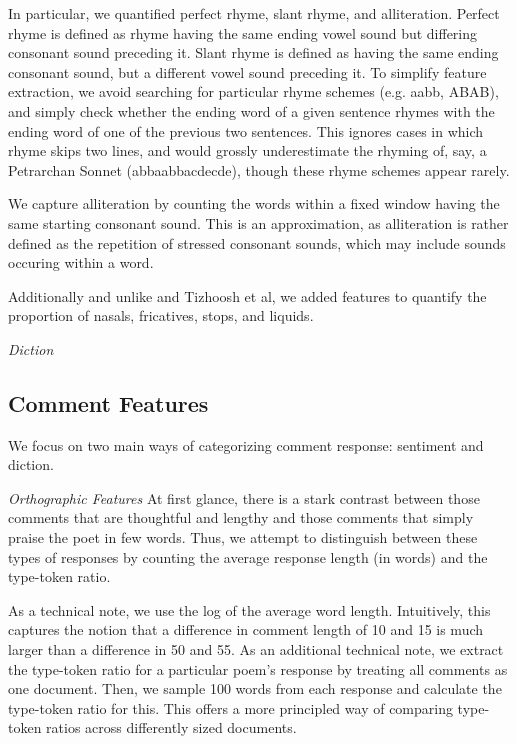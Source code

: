 \documentclass[11pt]{article}
\begin{document}
In particular, we quantified perfect rhyme, slant rhyme, and alliteration. Perfect rhyme is defined as rhyme having the same ending vowel sound but differing consonant sound preceding it. Slant rhyme is defined as having the same ending consonant sound, but a different vowel sound preceding it. To simplify feature extraction, we avoid searching for particular rhyme schemes (e.g. aabb, ABAB), and simply check whether the ending word of a given sentence rhymes with the ending word of one of the previous two sentences. This ignores cases in which rhyme skips two lines, and would grossly underestimate the rhyming of, say, a Petrarchan Sonnet (abbaabbacdecde), though these rhyme schemes appear rarely.

We capture alliteration by counting the words within a fixed window having the same starting consonant sound. This is an approximation, as alliteration is rather defined as the repetition of stressed consonant sounds, which may include sounds occuring within a word.

Additionally and unlike  and Tizhoosh et al, we added features to quantify the proportion of nasals, fricatives, stops, and liquids. 

\emph{Diction}

\subsection*{Comment Features}
We focus on two main ways of categorizing comment response: sentiment and diction.

\emph{Orthographic Features}
At first glance, there is a stark contrast between those comments that are thoughtful and lengthy and those comments that simply praise the poet in few words. Thus, we attempt to distinguish between these types of responses by counting the average response length (in words) and the type-token ratio.

As a technical note, we use the log of the average word length. Intuitively, this captures the notion that a difference in comment length of 10 and 15 is much larger than a difference in 50 and 55. As an additional technical note, we extract the type-token ratio for a particular poem's response by treating all comments as one document. Then, we sample 100 words from each response and calculate the type-token ratio for this. This offers a more principled way of comparing type-token ratios across differently sized documents.
\end{document}
